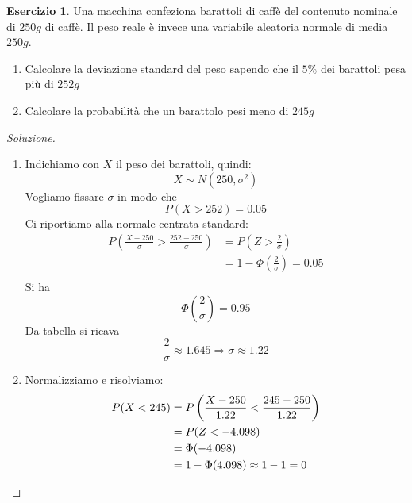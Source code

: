 \documentclass{article}
\theoremstyle{plain}
\theoremstyle{definition}
\newtheorem{esercizio}{Esercizio}[section]
\theoremstyle{remark}
\newenvironment{soluzione}
	{\renewcommand\qedsymbol{$\mathwitch*$}\begin{proof}[Soluzione]}
	{\end{proof}}
\renewcommand{\qedsymbol}{$\mathrightghost$}
\begin{document}
\begin{esercizio}
	Una macchina confeziona barattoli di caffè del contenuto nominale di $250g$ di caffè. Il peso reale è invece una variabile aleatoria normale di media $250g$.
	\begin{enumerate}
		\item Calcolare la deviazione standard del peso sapendo che il $5\%$ dei barattoli pesa più di $252g$
		\item Calcolare la probabilità che un barattolo pesi meno di $245g$
	\end{enumerate}
	\begin{soluzione}
		\begin{enumerate}
			\item Indichiamo con $X$ il peso dei barattoli, quindi:
			\begin{equation*}
				X\sim N(250, \sigma^2)
			\end{equation*}
			Vogliamo fissare $\sigma$ in modo che
			\begin{equation*}
				P(X>252)=0.05
			\end{equation*}
			Ci riportiamo alla normale centrata standard:
			\begin{align*}
				P\left(\frac{X-250}{\sigma}>\frac{252-250}{\sigma}\right)&=P\left(Z>\frac{2}{\sigma}\right)\\
				&=1-\Phi\left(\frac{2}{\sigma}\right)=0.05\\
			\end{align*}
			Si ha
			\begin{equation*}
				\Phi\left(\frac{2}{\sigma}\right)=0.95
			\end{equation*}
			Da tabella si ricava
			\begin{equation*}
				\frac{2}{\sigma}\approx1.645\Rightarrow \sigma\approx1.22
			\end{equation*}
			\item Normalizziamo e risolviamo:
			\begin{align*}
				P(X<245)&=P\left(\frac{X-250}{1.22}<\frac{245-250}{1.22}\right)\\
				&=P(Z<-4.098)\\
				&=\Phi(-4.098)\\
				&=1-\Phi(4.098)\approx1-1=0\qedhere
			\end{align*}
		\end{enumerate}
	\end{soluzione}
\end{esercizio}
\end{document}
